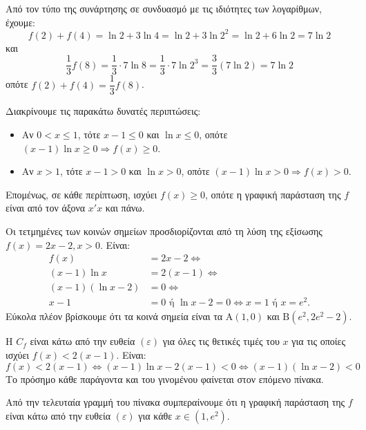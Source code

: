 \documentclass[11pt,a4paper,twoside]{book}
\begin{document}
\begin{alist}
\item Από τον τύπο της συνάρτησης σε συνδυασμό με τις ιδιότητες των λογαρίθμων, έχουμε:
\[f(2) + f(4) = \ln 2 + 3\ln 4 = \ln 2 + 3\ln 2^2 = \ln 2 + 6\ln 2 = 7\ln 2\]
και
\[\frac{1}{3}f(8) = \frac{1}{3}\cdot 7\ln 8 = \frac{1}{3}\cdot 7\ln 2^3 = \frac{3}{3}(7\ln 2) = 7\ln 2\]
οπότε $f(2) + f(4) = \dfrac{1}{3}f(8)$.
\item Διακρίνουμε τις παρακάτω δυνατές περιπτώσεις:
\begin{itemize}
    \item Αν $0 < x \le 1$, τότε $x - 1 \le 0$ και $\ln x \le 0$, οπότε $(x - 1)\ln x \ge 0 \Rightarrow f(x) \ge 0$.
    \item Αν $x > 1$, τότε $x - 1 > 0$ και $\ln x > 0$, οπότε $(x - 1)\ln x > 0 \Rightarrow f(x) > 0$.
\end{itemize}
Επομένως, σε κάθε περίπτωση, ισχύει $f(x) \ge 0$, οπότε η γραφική παράσταση της $f$ είναι από τον άξονα $x'x$ και πάνω.
\item 
\begin{rlist}
\item Οι τετμημένες των κοινών σημείων προσδιορίζονται από τη λύση της εξίσωσης $f(x) = 2x - 2, x > 0$. Είναι:
\begin{align*}
f(x) &= 2x - 2 \Leftrightarrow \\
(x - 1)\ln x &= 2(x - 1) \Leftrightarrow \\
(x - 1)(\ln x - 2) &= 0 \Leftrightarrow \\
x - 1 &= 0 \text{ ή } \ln x - 2 = 0 \Leftrightarrow x = 1 \text{ ή } x = e^2.
\end{align*}
Εύκολα πλέον βρίσκουμε ότι τα κοινά σημεία είναι τα $\text{A}(1,0)$ και $\text{B}(e^2, 2e^2 - 2)$.
\item Η $C_f$ είναι κάτω από την ευθεία $(\varepsilon)$ για όλες τις θετικές τιμές του $x$ για τις οποίες ισχύει $f(x) < 2(x - 1)$. Είναι:
\[f(x) < 2(x - 1) \Leftrightarrow (x - 1)\ln x - 2(x - 1) < 0 \Leftrightarrow (x - 1)(\ln x - 2) < 0\]
Το πρόσημο κάθε παράγοντα και του γινομένου φαίνεται στον επόμενο πίνακα.
\begin{center}
\end{center}
Από την τελευταία γραμμή του πίνακα συμπεραίνουμε ότι η γραφική παράσταση της $f$ είναι κάτω από την ευθεία $(\varepsilon)$ για κάθε $x \in (1, e^2)$.
\end{rlist}
\end{alist}
\end{document}

